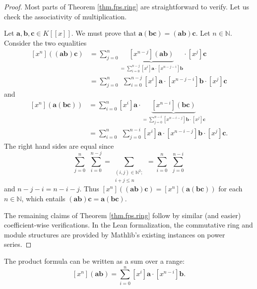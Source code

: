 \begin{proof}
Most parts of Theorem \ref{thm.fps.ring}
are straightforward to verify. Let us check the associativity of multiplication.

Let $\mathbf{a},\mathbf{b},\mathbf{c}\in K\left[\left[x\right]\right]$.
We must prove that $\mathbf{a}\left(\mathbf{bc}\right) = \left(
\mathbf{ab}\right)\mathbf{c}$. Let $n\in\mathbb{N}$. Consider the two
equalities
\begin{align*}
\left[x^{n}\right]\left(\left(\mathbf{ab}\right)\mathbf{c}\right)
& =\sum_{j=0}^{n}\underbrace{\left[x^{n-j}\right]\left(\mathbf{ab}%
\right)}_{=\sum_{i=0}^{n-j}\left[x^{i}\right]\mathbf{a}%
\cdot\left[x^{n-j-i}\right]\mathbf{b}}\cdot\left[x^{j}\right]\mathbf{c}\\
& =\sum_{j=0}^{n}\ \ \sum_{i=0}^{n-j}\left[x^{i}\right]\mathbf{a}%
\cdot\left[x^{n-j-i}\right]\mathbf{b}\cdot\left[x^{j}\right]\mathbf{c}%
\end{align*}
and
\begin{align*}
\left[x^{n}\right]\left(\mathbf{a}\left(\mathbf{bc}\right)\right)
& =\sum_{i=0}^{n}\left[x^{i}\right]\mathbf{a}\cdot\underbrace{\left[
x^{n-i}\right]\left(\mathbf{bc}\right)}_{=\sum_{j=0}%
^{n-i}\left[x^{n-i-j}\right]\mathbf{b}\cdot\left[x^{j}\right]
\mathbf{c}}\\
& =\sum_{i=0}^{n}\ \ \sum_{j=0}^{n-i}\left[x^{i}\right]\mathbf{a}%
\cdot\left[x^{n-i-j}\right]\mathbf{b}\cdot\left[x^{j}\right]
\mathbf{c}.
\end{align*}
The right hand sides are equal since
\[
\sum_{j=0}^{n}\ \ \sum_{i=0}^{n-j}=\sum_{\substack{\left(i,j\right)
\in\mathbb{N}^{2};\\i+j\leq n}}=\sum_{i=0}^{n}\ \ \sum_{j=0}^{n-i}
\]
and $n-j-i=n-i-j$. Thus $\left[x^{n}\right]\left(\left(\mathbf{ab}\right)\mathbf{c}\right)
=\left[x^{n}\right]\left(\mathbf{a}\left(\mathbf{bc}\right)\right)$
for each $n\in\mathbb{N}$, which entails $\left(\mathbf{ab}\right)
\mathbf{c}=\mathbf{a}\left(\mathbf{bc}\right)$.

The remaining claims of Theorem \ref{thm.fps.ring} follow by similar
(and easier) coefficient-wise verifications.
In the Lean formalization, the commutative ring and module structures are
provided by Mathlib's existing instances on power series.
\end{proof}

\begin{lemma}
\label{lem.fps.coeff_mul_range}
\leanhelper
\leanok
The product formula can be written as a sum over a range:
\[
\left[x^{n}\right]\left(\mathbf{ab}\right)
= \sum_{i=0}^{n}\left[x^{i}\right]\mathbf{a}\cdot\left[x^{n-i}\right]\mathbf{b}.
\]
\end{lemma}

